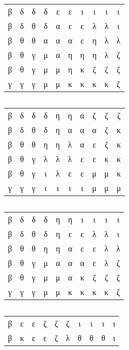 \begin{margintable}[-5cm]
\inputminted[fontsize=\footnotesize,]{python}{backtracking/pentominoes-regular-snippet.py}
{
\setlength{\tabcolsep}{4pt}
$\quad$\\
\begin{tabular}{|cccccccccc|}
\hline
β & δ & δ & δ & ε & ε & ι & ι & ι & ι \\
β & δ & θ & δ & α & ε & ε & λ & λ & ι \\
β & θ & θ & α & α & α & ε & η & λ & λ \\
β & θ & γ & μ & α & η & η & η & λ & ζ \\
β & θ & γ & μ & μ & η & κ & ζ & ζ & ζ \\
γ & γ & γ & μ & μ & κ & κ & κ & κ & ζ \\
\hline
\end{tabular}
$\quad$\\
$\quad$\\
\begin{tabular}{|cccccccccc|}
\hline
β & δ & δ & δ & η & η & α & ζ & ζ & ζ \\
β & δ & θ & δ & η & α & α & α & ζ & κ \\
β & θ & θ & η & η & λ & α & ε & ζ & κ \\
β & θ & γ & λ & λ & λ & ε & ε & κ & κ \\
β & θ & γ & ι & λ & ε & ε & μ & μ & κ \\
γ & γ & γ & ι & ι & ι & ι & μ & μ & μ \\
\hline
\end{tabular}
$\quad$\\
$\quad$\\
\begin{tabular}{|cccccccccc|}
\hline
β & δ & δ & δ & η & η & ι & ι & ι & ι \\
β & δ & θ & δ & η & ε & ε & λ & λ & ι \\
β & θ & θ & η & η & α & ε & ε & λ & λ \\
β & θ & γ & μ & α & α & α & ε & λ & ζ \\
β & θ & γ & μ & μ & α & κ & ζ & ζ & ζ \\
γ & γ & γ & μ & μ & κ & κ & κ & κ & ζ \\
\hline
\end{tabular}
$\quad$\\
$\quad$\\
\begin{tabular}{|cccccccccc|}
\hline
β & ε & ε & ζ & ζ & ζ & ι & ι & ι & ι \\
β & κ & ε & ε & ζ & λ & θ & θ & θ & ι \\

\end{tabular}}
\end{margintable}
